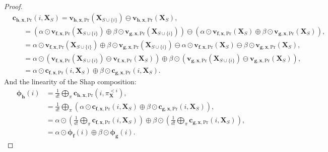 \documentclass{article}
\theoremstyle{plain}
\theoremstyle{definition}
\theoremstyle{remark}
\begin{document}
\begin{proof}
\begin{equation}
    \begin{aligned}
      &\bm{c}_{\bm{h},\bm{x},\text{Pr}}(i,\bm{X}_S) = \bm{v}_{\bm{h},\bm{x},\text{Pr}}(\bm{X}_{S\cup\{i\}}) \ominus \bm{v}_{\bm{h},\bm{x},\text{Pr}}(\bm{X}_S),\\
      &~~~~~~~= \left( \alpha \odot \bm{v}_{\bm{f},\bm{x},\text{Pr}}(\bm{X}_{S\cup\{i\}}) \oplus \beta \odot \bm{v}_{\bm{g},\bm{x},\text{Pr}}(\bm{X}_{S\cup\{i\}}) \right) \ominus \left( \alpha \odot \bm{v}_{\bm{f},\bm{x},\text{Pr}}(\bm{X}_S) \oplus \beta \odot \bm{v}_{\bm{g},\bm{x},\text{Pr}}(\bm{X}_S) \right),\\
      &~~~~~~~= \alpha \odot \bm{v}_{\bm{f},\bm{x},\text{Pr}}(\bm{X}_{S\cup\{i\}}) \oplus \beta \odot \bm{v}_{\bm{g},\bm{x},\text{Pr}}(\bm{X}_{S\cup\{i\}}) \ominus\alpha \odot \bm{v}_{\bm{f},\bm{x},\text{Pr}}(\bm{X}_S) \ominus \beta \odot \bm{v}_{\bm{g},\bm{x},\text{Pr}}(\bm{X}_S),\\
      &~~~~~~~= \alpha \odot \left( \bm{v}_{\bm{f},\bm{x},\text{Pr}}(\bm{X}_{S\cup\{i\}}) \ominus \bm{v}_{\bm{f},\bm{x},\text{Pr}}(\bm{X}_S) \right) \oplus \beta \odot \left( \bm{v}_{\bm{g},\bm{x},\text{Pr}}(\bm{X}_{S\cup\{i\}}) \ominus \bm{v}_{\bm{g},\bm{x},\text{Pr}}(\bm{X}_S)\right),\\
      &~~~~~~~= \alpha \odot \bm{c}_{\bm{f},\bm{x},\text{Pr}}(i,\bm{X}_S) \oplus \beta \odot \bm{c}_{\bm{g},\bm{x},\text{Pr}}(i,\bm{X}_S).
    \end{aligned}
  \end{equation}
  And the linearity of the Shap composition:
  \begin{equation}
    \begin{aligned}
      \bm{\phi}_{\bm{h}}(i) &= \frac{1}{d!}  \underset{\pi}{\bigoplus}\bm{c}_{\bm{h},\bm{x},\text{Pr}}(i,\pi^{<i}_{\bm{X}}),\\
                            &= \frac{1}{d!}  \underset{\pi}{\bigoplus}\left( \alpha \odot \bm{c}_{\bm{f},\bm{x},\text{Pr}}(i,\bm{X}_S) \oplus \beta \odot \bm{c}_{\bm{g},\bm{x},\text{Pr}}(i,\bm{X}_S) \right),\\
                            &= \alpha \odot \left( \frac{1}{d!}  \underset{\pi}{\bigoplus} \bm{c}_{\bm{f},\bm{x},\text{Pr}}(i,\bm{X}_S) \right) \oplus \beta \odot \left( \frac{1}{d!} \underset{\pi}{\bigoplus}    \bm{c}_{\bm{g},\bm{x},\text{Pr}}(i,\bm{X}_S) \right),\\
                            &= \alpha \odot \bm{\phi}_{\bm{f}}(i) \oplus \beta\odot \bm{\phi}_{\bm{g}}(i).
    \end{aligned}
  \end{equation}
\end{proof}
\end{document}
